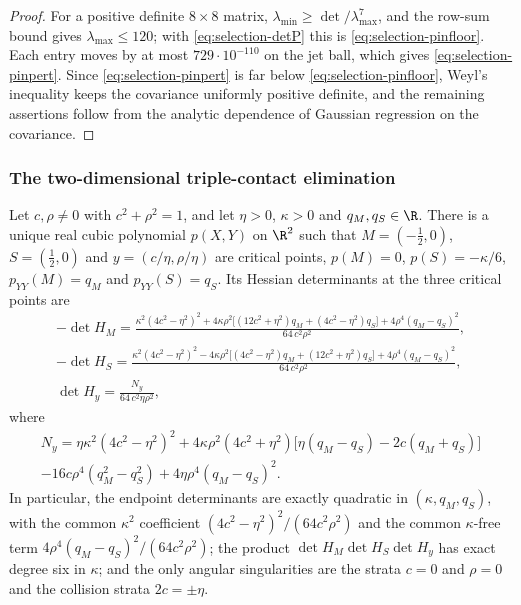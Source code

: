 \begin{proof}
For a positive definite $8\times8$ matrix, $\lambda_{\min}\ge\det/\lambda_{\max}^7$, and the row-sum bound gives $\lambda_{\max}\le120$; with \eqref{eq:selection-detP} this is \eqref{eq:selection-pinfloor}. Each entry moves by at most $729\cdot10^{-110}$ on the jet ball, which gives \eqref{eq:selection-pinpert}. Since \eqref{eq:selection-pinpert} is far below \eqref{eq:selection-pinfloor}, Weyl's inequality keeps the covariance uniformly positive definite, and the remaining assertions follow from the analytic dependence of Gaussian regression on the covariance.
\end{proof}

\subsubsection{The two-dimensional triple-contact elimination}

\begin{lemma}\label{lem:selection-elimination}
Let $c,\rho\ne0$ with $c^2+\rho^2=1$, and let $\eta>0$, $\kappa>0$ and $q_M,q_S\in\R$. There is a unique real cubic polynomial $p(X,Y)$ on $\R^2$ such that $M=(-\frac12,0)$, $S=(\frac12,0)$ and $y=(c/\eta,\rho/\eta)$ are critical points, $p(M)=0$, $p(S)=-\kappa/6$, $p_{YY}(M)=q_M$ and $p_{YY}(S)=q_S$. Its Hessian determinants at the three critical points are
\begin{gather}
-\det H_M=\frac{\kappa^2(4c^2-\eta^2)^2+4\kappa\rho^2\bigl[(12c^2+\eta^2)q_M+(4c^2-\eta^2)q_S\bigr]+4\rho^4(q_M-q_S)^2}{64\,c^2\rho^2},\label{eq:selection-B1}\\
-\det H_S=\frac{\kappa^2(4c^2-\eta^2)^2-4\kappa\rho^2\bigl[(4c^2-\eta^2)q_M+(12c^2+\eta^2)q_S\bigr]+4\rho^4(q_M-q_S)^2}{64\,c^2\rho^2},\label{eq:selection-B1S}\\
\det H_y=\frac{N_y}{64\,c^2\eta\rho^2},\label{eq:selection-B1y}
\end{gather}
where
\begin{multline}\label{eq:selection-Ny}
N_y=\eta\kappa^2(4c^2-\eta^2)^2+4\kappa\rho^2(4c^2+\eta^2)\bigl[\eta(q_M-q_S)-2c(q_M+q_S)\bigr]\\
-16c\rho^4(q_M^2-q_S^2)+4\eta\rho^4(q_M-q_S)^2 .
\end{multline}
In particular, the endpoint determinants are exactly quadratic in $(\kappa,q_M,q_S)$, with the common $\kappa^2$ coefficient $(4c^2-\eta^2)^2/(64c^2\rho^2)$ and the common $\kappa$-free term $4\rho^4(q_M-q_S)^2/(64c^2\rho^2)$; the product $\det H_M\det H_S\det H_y$ has exact degree six in $\kappa$; and the only angular singularities are the strata $c=0$ and $\rho=0$ and the collision strata $2c=\pm\eta$.
\end{lemma}

